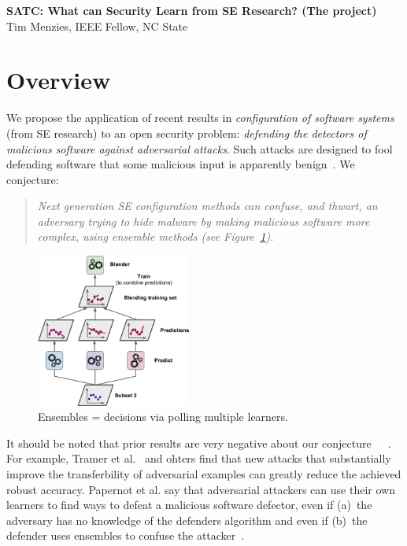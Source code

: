 \documentclass{NSF}
\newcommand{\fig}[1]{Figure~\ref{fig:#1}}
\newcommand{\IT}{{\sffamily {\em MASS~CONFUSION}}}
\newcommand{\TITLE}{SATC: What can Security Learn from SE Research? (The {\IT} project)}
\begin{document}
\begin{nsfdescription}
\thispagestyle{plain}
 \begin{center}
{\bf \TITLE}\\
{Tim Menzies,  IEEE Fellow,  NC State}
 \end{center}




 \section{Overview}\label{tion:intro}
 \noindent
    We propose the application of recent results in 
 {\em configuration of software systems} (from SE research) to an open security problem:   
 {\em defending the detectors of malicious software against adversarial attacks}.  Such attacks are  designed to fool     defending software that some   malicious input  is apparently benign~\cite{wang2019security}.
 We conjecture: 
  \begin{quote}
 {\em Next generation SE configuration methods can  confuse, and thwart, an adversary trying to hide  malware  by making  malicious software more complex, using ensemble methods (see  \fig{ensemble}).}
 \end{quote}

\begin{figure}
\includegraphics[width=2in]{fig/ensemble.png}
\caption{ Ensembles = decisions via polling   multiple learners.}
\label{fig:ensemble}
\end{figure}  
\noindent It should be noted that prior results are very negative about
our conjecture~\cite{he2017adversarial}~\cite{DBLP:conf/iclr/TramerKPGBM18}~\cite{papernot2016transferability}. For example, Tramer et al.~\cite{DBLP:conf/iclr/TramerKPGBM18} and ohters
find that new attacks that substantially improve the transferbility of adversarial examples can greatly reduce the achieved robust accuracy. Papernot et al. say that adversarial  attackers can use their own learners to find ways to defeat a malicious software defector, even if (a)~the adversary has no knowledge of the defenders algorithm and  even if (b)~the defender uses ensembles to confuse the attacker~\cite{papernot2016transferability}.



\end{nsfdescription}
\end{document}
